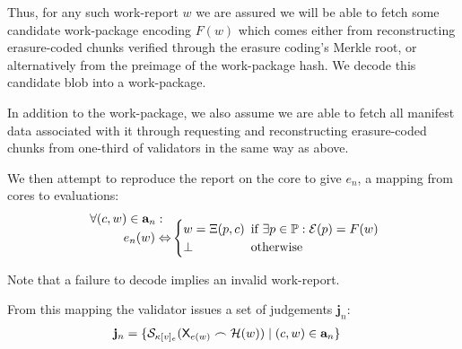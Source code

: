 Thus, for any such work-report $w$ we are assured we will be able to fetch some candidate work-package encoding $F(w)$ which comes either from reconstructing erasure-coded chunks verified through the erasure coding's Merkle root, or alternatively from the preimage of the work-package hash. We decode this candidate blob into a work-package.

In addition to the work-package, we also assume we are able to fetch all manifest data associated with it through requesting and reconstructing erasure-coded chunks from one-third of validators in the same way as above.

We then attempt to reproduce the report on the core to give $e_n$, a mapping from cores to evaluations: \vskip -7pt
\begin{equation}
  \begin{aligned}
    \forall (c, w) \in \mathbf{a}_n :\ \ &\\[-10pt]
    e_n(w) \Leftrightarrow &\begin{cases}
      w = \Xi(p, c)\!\!\! &\text{if } \exists p \in \mathbb{P}: \mathcal{E}(p) = F(w) \\
      \bot &\text{otherwise}
    \end{cases}
  \end{aligned}\!\!
\end{equation}

Note that a failure to decode implies an invalid work-report.

From this mapping the validator issues a set of judgements $\mathbf{j}_n$:
\begin{align}
  \mathbf{j}_n &= \{ \mathcal{S}_{\kappa[v]_e}(\mathsf{X}_{e(w)} \frown \mathcal{H}(w)) \mid (c, w) \in \mathbf{a}_n \}
\end{align}


